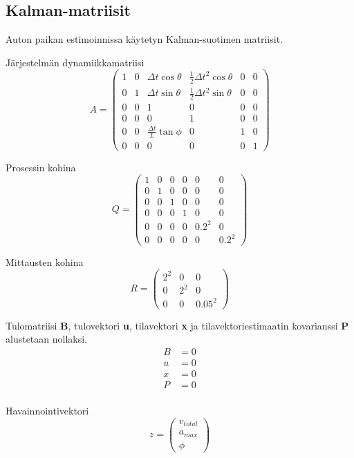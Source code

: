 \documentclass{article}
\begin{document}
\begin{appendices}
\section{Kalman-matriisit} \label{app:kalman}

Auton paikan estimoinnissa käytetyn Kalman-suotimen matriisit.

Järjestelmän dynamiikkamatriisi
\[
A =
\begin{pmatrix}
1 & 0 & \Delta{t}\cos{\theta} & \frac{1}{2}\Delta{t}^{2} \cos{\theta} & 0 & 0 \\
0 & 1 & \Delta{t}\sin{\theta} & \frac{1}{2}\Delta{t}^{2} \sin{\theta} & 0 & 0 \\
0 & 0 & 1 & 0 & 0 & 0 \\
0 & 0 & 0 & 1 & 0 & 0 \\
0 & 0 & \frac{\Delta{t}}{L} \tan{\phi} & 0 & 1 & 0 \\
0 & 0 & 0 & 0 & 0 & 1
\end{pmatrix}
\]

Prosessin kohina
\[
Q =
\begin{pmatrix}
1 & 0 & 0 & 0 & 0 & 0 \\
0 & 1 & 0 & 0 & 0 & 0 \\
0 & 0 & 1 & 0 & 0 & 0 \\
0 & 0 & 0 & 1 & 0 & 0 \\
0 & 0 & 0 & 0 & 0.2^2 & 0 \\
0 & 0 & 0 & 0 & 0 & 0.2^2
\end{pmatrix}
\]

Mittausten kohina
\[
R =
\begin{pmatrix}
2^2 & 0 & 0 \\
0 & 2^2 & 0 \\
0 & 0 & 0.05^2
\end{pmatrix}
\]

Tulomatriisi \textbf{B}, tulovektori \textbf{u}, tilavektori \textbf{x} ja tilavektoriestimaatin kovarianssi \textbf{P} alustetaan nollaksi.
\begin{align*}
B &= 0\\
u &= 0\\
x &= 0\\
P &= 0\\
\end{align*}

Havainnointivektori
\[
z =
\begin{pmatrix}
v_{total} \\
a_{max} \\
\phi
\end{pmatrix}
\]


\end{appendices}
\end{document}
